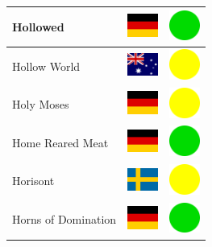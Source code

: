 \documentclass[12pt, a4paper, twoside]{report}
\begin{document}
\begin{center}
\begin{longtable}{|p{5cm}|p{2cm}|p{2cm}|}
 Hollowed                                                   & \includegraphics[width=1cm]{4x3/de} &   \includegraphics[width=1cm]{likes/y} \\ \hline
 Hollow World                                               & \includegraphics[width=1cm]{4x3/au} &   \includegraphics[width=1cm]{likes/m} \\ \hline
 Holy Moses                                                 & \includegraphics[width=1cm]{4x3/de} &   \includegraphics[width=1cm]{likes/m} \\ \hline
 Home Reared Meat                                           & \includegraphics[width=1cm]{4x3/de} &   \includegraphics[width=1cm]{likes/y} \\ \hline
 Horisont                                                   & \includegraphics[width=1cm]{4x3/se} &   \includegraphics[width=1cm]{likes/m} \\ \hline
 Horns of Domination                                        & \includegraphics[width=1cm]{4x3/de} &   \includegraphics[width=1cm]{likes/y} \\ \hline

\end{longtable}
\end{center}
\end{document}
